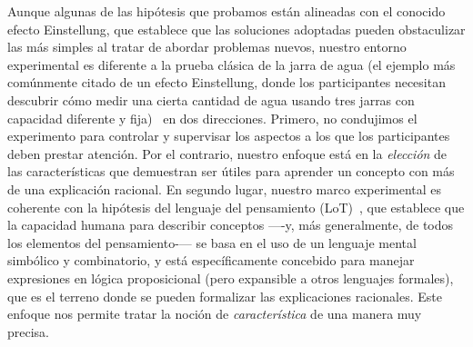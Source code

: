 Aunque algunas de las hipótesis que probamos están alineadas con el conocido efecto Einstellung, que establece que las soluciones adoptadas pueden obstaculizar las más simples al tratar de abordar problemas nuevos, nuestro entorno experimental es diferente a la prueba clásica de la jarra de agua (el ejemplo más comúnmente citado de un efecto Einstellung, donde los participantes necesitan descubrir cómo medir una cierta cantidad de agua usando tres jarras con capacidad diferente y fija)~\cite{luchins1942mechanization} en dos direcciones. Primero, no condujimos el experimento para controlar y supervisar los aspectos a los que los participantes deben prestar atención. Por el contrario, nuestro enfoque está en la {\em elección} de las características que demuestran ser útiles para aprender un concepto con más de una explicación racional. En segundo lugar, nuestro marco experimental es coherente con la hipótesis del lenguaje del pensamiento (LoT)~\cite{fodor1975language}, que establece que la capacidad humana para describir conceptos —-y, más generalmente, de todos los elementos del pensamiento-— se basa en el uso de un lenguaje mental simbólico y combinatorio, y está específicamente concebido para manejar expresiones en lógica proposicional (pero expansible a otros lenguajes formales), que es el terreno donde se pueden formalizar las explicaciones racionales. Este enfoque nos permite tratar la noción de {\em característica} de una manera muy precisa.


